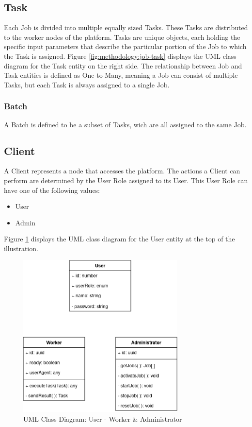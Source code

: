 \subsection{Task}
\label{subsec:methodology:entities:task}
Each Job is divided into multiple equally sized Tasks. These Tasks are distributed to the worker nodes of the platform. Tasks are unique objects, each holding the specific input parameters that describe the particular portion of the Job to which the Task is assigned. Figure \ref{fig:methodology:job-task} displays the \ac{UML} class diagram for the Task entity on the right side. The relationship between Job and Task entities is defined as One-to-Many, meaning a Job can consist of multiple Tasks, but each Task is always assigned to a single Job.

\subsubsection{Batch}
\label{ssubsec:methodology:entities:task:batch}
A Batch is defined to be a subset of Tasks, wich are all assigned to the same Job.

\subsection{Client}
\label{subsec:methodology:entities:client}
A Client represents a node that accesses the platform. The actions a Client can perform are determined by the User Role assigned to its User. This User Role can have one of the following values:
\begin{itemize}
  \item User
  \item Admin
\end{itemize}
Figure \ref{fig:methodology:client} displays the \ac{UML} class diagram for the User entity at the top of the illustration.
\begin{figure}[htbp]
  \centering
  \includegraphics[width=0.75\textwidth]{gfx/figures/Client.png}
  \caption{\ac{UML} Class Diagram: User - Worker \& Administrator}
  \label{fig:methodology:client}
\end{figure}

